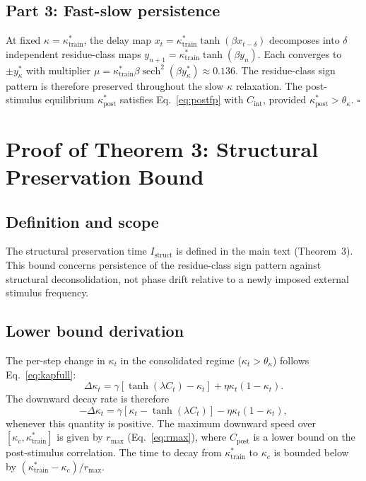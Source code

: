 \documentclass[12pt,a4paper]{article}
\begin{document}
\subsection{Part 3: Fast-slow persistence}
At fixed $\kappa = \kappa^*_{\mathrm{train}}$, the delay map $x_t = \kappa^*_{\mathrm{train}}\tanh(\beta x_{t-\delta})$ decomposes into $\delta$ independent residue-class maps $y_{n+1} = \kappa^*_{\mathrm{train}}\tanh(\beta y_n)$. Each converges to $\pm y^*_\kappa$ with multiplier $\mu = \kappa^*_{\mathrm{train}}\beta\operatorname{sech}^2(\beta y^*_\kappa) \approx 0.136$. The residue-class sign pattern is therefore preserved throughout the slow $\kappa$ relaxation. The post-stimulus equilibrium $\kappa^*_{\mathrm{post}}$ satisfies Eq.~\eqref{eq:postfp} with $C_{\mathrm{int}}$, provided $\kappa^*_{\mathrm{post}} > \theta_\kappa$. $\square$

\section{Proof of Theorem 3: Structural Preservation Bound}
\label{sec:proof_bound}

\subsection{Definition and scope}
The structural preservation time $I_{\mathrm{struct}}$ is defined in the main text (Theorem~3). This bound concerns persistence of the residue-class sign pattern against structural deconsolidation, not phase drift relative to a newly imposed external stimulus frequency.

\subsection{Lower bound derivation}
The per-step change in $\kappa_t$ in the consolidated regime ($\kappa_t > \theta_\kappa$) follows Eq.~\eqref{eq:kapfull}:
\begin{equation}
\Delta\kappa_t = \gamma[\tanh(\lambda C_t) - \kappa_t] + \eta\kappa_t(1-\kappa_t).
\end{equation}
The downward decay rate is therefore
\begin{equation}
-\Delta\kappa_t = \gamma[\kappa_t - \tanh(\lambda C_t)] - \eta\kappa_t(1-\kappa_t),
\end{equation}
whenever this quantity is positive. The maximum downward speed over $[\kappa_c, \kappa^*_{\mathrm{train}}]$ is given by $r_{\max}$ (Eq.~\eqref{eq:rmax}), where $C_{\mathrm{post}}$ is a lower bound on the post-stimulus correlation. The time to decay from $\kappa^*_{\mathrm{train}}$ to $\kappa_c$ is bounded below by $(\kappa^*_{\mathrm{train}} - \kappa_c)/r_{\max}$.
\end{document}
